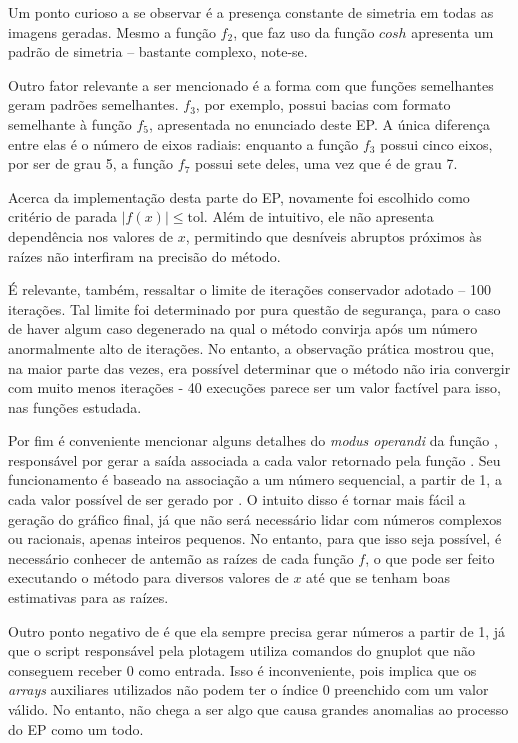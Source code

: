 \documentclass[11pt,reqno,a4paper]{amsart}
\newcommand{\code}[1]{\colorbox{light-gray}{\textcolor{dark-gray}{\fontsize{10}{10}{\texttt{#1}}}}}
\begin{document}
\medskip
Um ponto curioso a se observar é a presença constante de simetria em todas as imagens geradas. Mesmo a função $f_2$, que faz uso da função $cosh$ apresenta um padrão de simetria – bastante complexo, note-se.

\medskip
Outro fator relevante a ser mencionado é a forma com que funções semelhantes geram padrões semelhantes. $f_3$, por exemplo, possui bacias com formato semelhante à função $f_5$, apresentada no enunciado deste EP. A única diferença entre elas é o número de eixos radiais: enquanto a função $f_3$ possui cinco eixos, por ser de grau 5, a função $f_7$ possui sete deles, uma vez que é de grau 7.

\medskip
Acerca da implementação desta parte do EP, novamente foi escolhido como critério de parada $|f(x)| \leq \text{tol}$. Além de intuitivo, ele não apresenta dependência nos valores de $x$, permitindo que desníveis abruptos próximos às raízes não interfiram na precisão do método.

\medskip
É relevante, também, ressaltar o limite de iterações conservador adotado – 100 iterações. Tal limite foi determinado por pura questão de segurança, para o caso de haver algum caso degenerado na qual o método convirja após um número anormalmente alto de iterações. No entanto, a observação prática mostrou que, na maior parte das vezes, era possível determinar que o método não iria convergir com muito menos iterações - 40 execuções parece ser um valor factível para isso, nas funções estudada.

\medskip
Por fim é conveniente mencionar alguns detalhes do \textit{modus operandi} da função \code{output\_for}, responsável por gerar a saída associada a cada valor retornado pela função \code{newton}. Seu funcionamento é baseado na associação a um número sequencial, a partir de 1, a cada valor possível de ser gerado por \code{newton}. O intuito disso é tornar mais fácil a geração do gráfico final, já que não será necessário lidar com números complexos ou racionais, apenas inteiros pequenos. No entanto, para que isso seja possível, é necessário conhecer de antemão as raízes de cada função $f$, o que pode ser feito executando o método \code{newton} para diversos valores de $x$ até que se tenham boas estimativas para as raízes.

\medskip
Outro ponto negativo de \code{output\_for} é que ela sempre precisa gerar números a partir de 1, já que o script responsável pela plotagem utiliza comandos do gnuplot que não conseguem receber 0 como entrada. Isso é inconveniente, pois implica que os \textit{arrays} auxiliares utilizados não podem ter o índice 0 preenchido com um valor válido. No entanto, não chega a ser algo que causa grandes anomalias ao processo do EP como um todo.
\end{document}

